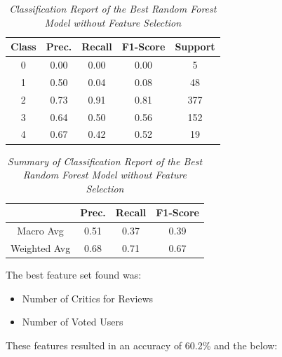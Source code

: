 \documentclass[11pt]{article}
\begin{document}
\begin{table}[!ht]
    \begin{center}
        \begin{tabular}{c|c|c|c|c}			
            \hline
            Class & Prec. & Recall & F1-Score & Support \\
            \hline\hline
            0 & 0.00 & 0.00 & 0.00 & 5 \\
            1 & 0.50 & 0.04 & 0.08 & 48 \\
            2 & 0.73 & 0.91 & 0.81 & 377 \\
            3 & 0.64 & 0.50 & 0.56 & 152 \\
            4 & 0.67 & 0.42 & 0.52 & 19\\
                \hline
        \end{tabular}

        \caption{\textit{Classification Report of the Best Random Forest Model without Feature Selection}}
        \label{rf-report}

    \end{center}
\end{table}
\begin{table}[!ht]
    \begin{center}
        \begin{tabular}{c||c|c|c}			
            \hline
             & Prec. & Recall & F1-Score \\
            \hline\hline
            Macro Avg & 0.51 & 0.37 & 0.39 \\
            Weighted Avg & 0.68 & 0.71 & 0.67 \\
                \hline
        \end{tabular}

        \caption{\textit{Summary of Classification Report of the Best Random Forest Model without Feature Selection}}
        \label{rf-report-sum}

    \end{center}
\end{table}
\noindent
The best feature set found was:
\begin{itemize}
    \item Number of Critics for Reviews
    \item Number of Voted Users
\end{itemize}
\noindent
These features resulted in an accuracy of 60.2\% and the below:
\end{document}
